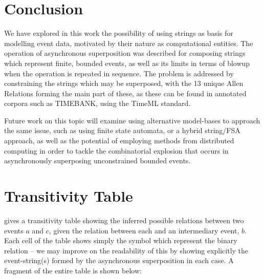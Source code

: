 \documentclass[a4paper,11pt,leqno]{article}
\begin{document}
\section{Conclusion}\label{conclusion}
We have explored in this work the possibility of using strings as basis for 
modelling event data, motivated by their nature as computational entities. The 
operation of asynchronous superposition was described for composing strings 
which represent finite, bounded events, as well as its limits in terms of 
blowup when the operation is repeated in sequence. The problem is addressed by 
constraining the strings which may be superposed, with the 13 unique 
Allen Relations forming the main part of these, as these can be found in 
annotated corpora such as TIMEBANK, using the TimeML standard.

Future work on this topic will examine using alternative model-bases to 
approach the same issue, such as using finite state automata, or a hybrid 
string/FSA approach, as well as the potential of employing methods from 
distributed computing in order to tackle the combinatorial explosion that 
occurs in asynchronously superposing unconstrained bounded events.
{}

\appendix
\section{Transitivity Table}
\cite{allen1983maintaining} gives a transitivity table showing the inferred 
possible relations between two events $a$ and $c$, given the relation between 
each and an intermediary event, $b$. Each cell of the table shows simply the 
symbol which represent the binary relation -- we may improve on the readability 
of this by showing explicitly the event-string(s) formed by the asynchronous 
superposition in each case. A fragment of the entire table is shown below:
\end{document}
